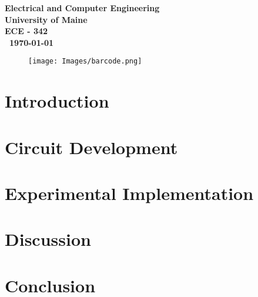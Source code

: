 \documentclass{article}
\begin{document}
\begin{titlepage}
\begin{center}
\begin{abstract}
        

        \end{abstract}
        
        
        \vspace{02.5cm}
        \textbf{
        Electrical and Computer Engineering\\
        University of Maine\\
        ECE - 342\\\ \today}
    \vspace{.5cm}
        \begin{figure}[H]
        \centering
        \texttt{[image: Images/barcode.png]}
\end{figure}
    \end{center}
\end{titlepage}


\tableofcontents

\newpage

\newpage
\listoffigures
\listoftables
\newpage 
\clearpage




\section{Introduction}

  
 
  \section{Circuit Development}
    
     
 
    
  \section{Experimental Implementation}
  	

    
  \section{Discussion}
     
    
    
    \section{Conclusion}
        
\end{document}
